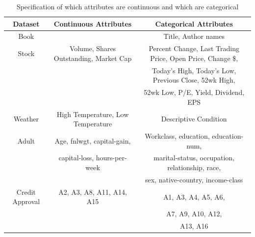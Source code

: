 \documentclass{acm_proc_article-sp}
\begin{document}
\begin{table}[t]
\small
\centering
\begin{tabular}{|c|c|c|}
\hline
\textbf{Dataset} & \bf Continuous Attributes & \bf  Categorical Attributes \\
\hline
Book &  & Title, Author names \\
\hline
Stock & Volume, Shares Outstanding, Market Cap & Percent Change, Last Trading Price, Open Price, Change \$, \\
& &  Today's High,  Today's Low, Previous Close, 52wk High, \\
& & 52wk Low,  P/E, Yield, Dividend, EPS \\
\hline
Weather & High Temperature, Low Temperature & Descriptive Condition  \\
\hline
Adult & Age, fnlwgt, capital-gain, & Workclass, education, education-num,  \\
& capital-loss, hours-per-week & marital-status, occupation, relationship, race, \\
& & sex, native-country, income-class \\
\hline
Credit Approval &  A2, A3, A8, A11, A14, A15 & A1, A3, A4, A5, A6, \\
& & A7, A9, A10, A12, \\
& & A13, A16 \\
\hline
\end{tabular}
\caption{Specification of which attributes are continuous and which are categorical}
\label{fig:catcont}
\end{table}
\end{document}
